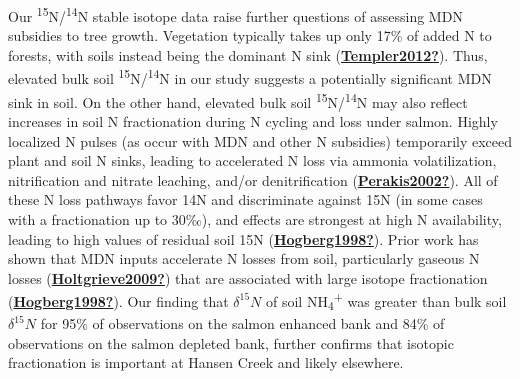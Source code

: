 \documentclass [11pt, proquest] {uwthesis}[2015/03/03]
\begin{document}
Our \textsuperscript{15}N/\textsuperscript{14}N stable isotope data raise further questions of assessing MDN subsidies to tree growth. Vegetation typically takes up only 17\% of added N to forests, with soils instead being the dominant N sink (\protect\hyperlink{ref-Templer2012}{\textbf{Templer2012?}}). Thus, elevated bulk soil \textsuperscript{15}N/\textsuperscript{14}N in our study suggests a potentially significant MDN sink in soil. On the other hand, elevated bulk soil \textsuperscript{15}N/\textsuperscript{14}N may also reflect increases in soil N fractionation during N cycling and loss under salmon. Highly localized N pulses (as occur with MDN and other N subsidies) temporarily exceed plant and soil N sinks, leading to accelerated N loss via ammonia volatilization, nitrification and nitrate leaching, and/or denitrification (\protect\hyperlink{ref-Perakis2002}{\textbf{Perakis2002?}}). All of these N loss pathways favor 14N and discriminate against 15N (in some cases with a fractionation up to 30‰), and effects are strongest at high N availability, leading to high values of residual soil 15N (\protect\hyperlink{ref-Hogberg1998}{\textbf{Hogberg1998?}}). Prior work has shown that MDN inputs accelerate N losses from soil, particularly gaseous N losses (\protect\hyperlink{ref-Holtgrieve2009}{\textbf{Holtgrieve2009?}}) that are associated with large isotope fractionation (\protect\hyperlink{ref-Hogberg1998}{\textbf{Hogberg1998?}}). Our finding that \(\delta^{15}N\) of soil NH\textsubscript{4}\textsuperscript{+} was greater than bulk soil \(\delta^{15}N\) for 95\% of observations on the salmon enhanced bank and 84\% of observations on the salmon depleted bank, further confirms that isotopic fractionation is important at Hansen Creek and likely elsewhere.
\end{document}
